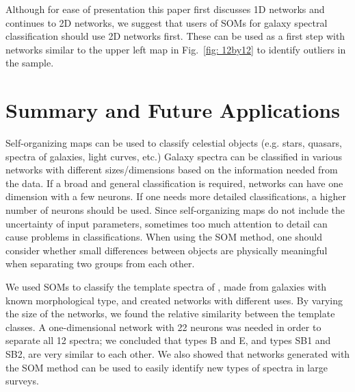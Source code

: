     Although for ease of presentation this paper first discusses 1D networks and continues to 2D networks, we suggest that users of SOMs for galaxy spectral classification should use 2D networks first. These can be used as a first step with networks similar to the upper left map in Fig.~\ref{fig: 12by12} to identify outliers in the sample.


\section{Summary and Future Applications}
\label{sec: summary_SOMZ}

Self-organizing maps can be used to classify celestial objects (e.g. stars, quasars, spectra of galaxies, light curves, etc.)
Galaxy spectra can be classified in various networks with different sizes/dimensions based on the information needed from the data. 
If a broad and general classification is required, networks can have one dimension with a few neurons.
If one needs more detailed classifications, a higher number of neurons should be used.
Since self-organizing maps do not include the uncertainty of input parameters, sometimes too much attention to detail can cause problems in classifications. 
When using the SOM method, one should consider whether small differences between objects are physically meaningful when separating two groups from each other.

We used SOMs to classify the template spectra of , made from galaxies with known morphological type, and created networks with different uses.
By varying the size of the networks, we found the relative similarity between the  template classes.
A one-dimensional network with 22 neurons was needed in order to
separate all 12  spectra; we concluded that  types B and E, and types SB1 and SB2, are very similar to each other.
We also showed that networks generated with the SOM method can be used to easily identify new types of spectra in large surveys.

